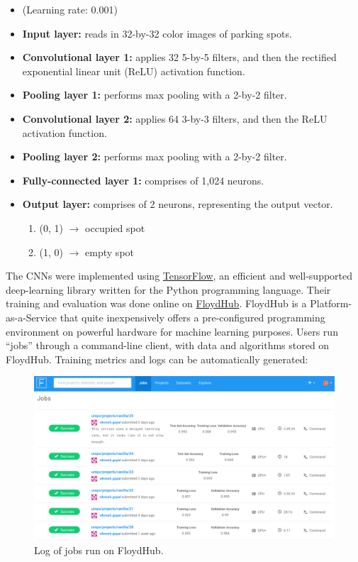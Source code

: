 \documentclass[a4paper, 11pt]{article} %
\begin{document}
	\begin{itemize}
		\setlength\itemsep{-3mm}
		\item[] (Learning rate: 0.001)
		\item[] \textbf{Input layer:} reads in 32-by-32 color images of parking 
		spots.
		\item[] \textbf{Convolutional layer 1:} applies 32 5-by-5 filters, and 
		then the 
		rectified exponential linear unit (ReLU) activation function.
		\item[] \textbf{Pooling layer 1:} performs max pooling with a 2-by-2 
		filter.
		\item[] \textbf{Convolutional layer 2:} applies 64 3-by-3 filters, and 
		then the 
		ReLU activation function.
		\item[] \textbf{Pooling layer 2:} performs max pooling with a 2-by-2 
		filter.
		\item[] \textbf{Fully-connected layer 1:} comprises of 1,024 neurons.
		\item[] \textbf{Output layer:} comprises of 2 neurons, representing the 
		output vector.
		\vspace*{-4mm}
		\begin{enumerate}
			\setlength\itemsep{-3mm}
			\item[] (0, 1) $\rightarrow$ occupied spot
			\item[] (1, 0) $\rightarrow$ empty spot
		\end{enumerate}
	\end{itemize}
   	The CNNs were implemented using 
   	\href{https://www.tensorflow.org}{TensorFlow}, an efficient and 
   	well-supported deep-learning library written for the Python programming 
   	language. Their training and 
   	evaluation was done online on 
   	\href{https://www.floydhub.com}{FloydHub}. FloydHub is a 
   	Platform-as-a-Service that quite inexpensively offers a pre-configured programming environment on 
   	powerful hardware for machine learning purposes. Users run ``jobs'' through 
   	a command-line client, 
   	with data and algorithms stored on FloydHub. Training metrics and logs can 
   	be automatically 
    generated:
    \vskip 5mm
    \begin{figure}[H]
    	\centering
    	\includegraphics[width=14cm]{figures/floydhub.png}
    	\caption{Log of jobs run on FloydHub.}
    \end{figure}
\end{document}
